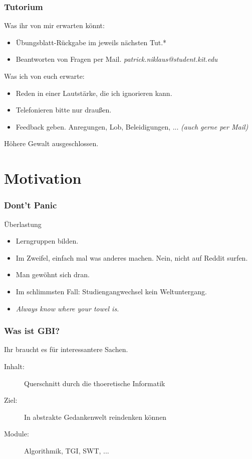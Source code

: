 \documentclass{beamer}
\begin{document}
\begin{frame}
  \frametitle{Tutorium}
  \begin{block}{Was ihr von mir erwarten könnt:}
    \begin{itemize}
      \item Übungsblatt-Rückgabe im jeweils nächsten Tut.*
      \item Beantworten von Fragen per Mail. {\small \emph{patrick.niklaus@student.kit.edu}}
    \end{itemize}
  \end{block}
    \begin{block}{Was ich von euch erwarte:}
    \begin{itemize}
      \item Reden in einer Lautstärke, die ich ignorieren kann.
      \item Telefonieren bitte nur draußen.
      \item Feedback geben. Anregungen, Lob, Beleidigungen, ... \emph{(auch gerne per Mail)}
    \end{itemize}
  \end{block}
  \footnotesize *Höhere Gewalt ausgeschlossen.
\end{frame}

\section{Motivation}
\begin{frame}
  \frametitle{Dont't Panic}
  \begin{block}{Überlastung}
    \begin{itemize}
      \item Lerngruppen bilden.
      \item Im Zweifel, einfach mal was anderes machen. {\tiny Nein, nicht auf Reddit surfen.}
      \item Man gewöhnt sich dran.
      \item Im schlimmsten Fall: Studiengangwechsel kein Weltuntergang.
      \item\textit{Always know where your towel is.}
    \end{itemize}
  \end{block}
\end{frame}
\begin{frame}
  \frametitle{Was ist GBI?}
  \begin{block}{Ihr braucht es für interessantere Sachen.}
    \begin{description}
      \item[Inhalt:] Querschnitt durch die thoeretische Informatik
      \item[Ziel:] In abstrakte Gedankenwelt reindenken können
      \item[Module:] Algorithmik, TGI, SWT, ...
    \end{description}
  \end{block}
\end{frame}
\end{document}
